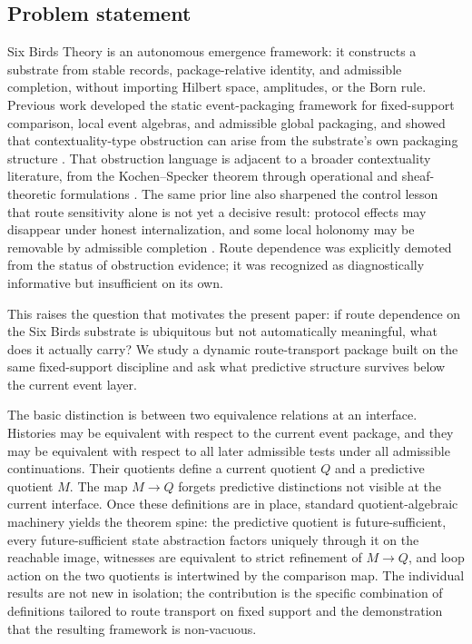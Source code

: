 \documentclass[11pt]{article}
\newcommand{\CurrentQ}{Q}
\newcommand{\PredictiveQ}{M}
\theoremstyle{definition}
\begin{document}
\subsection{Problem statement}\label{subsec:intro-problem}
Six Birds Theory is an autonomous emergence framework: it constructs a substrate from stable records, package-relative identity, and admissible completion, without importing Hilbert space, amplitudes, or the Born rule. Previous work developed the static event-packaging framework for fixed-support comparison, local event algebras, and admissible global packaging, and showed that contextuality-type obstruction can arise from the substrate's own packaging structure \citep{Tsiokos2026EventPackages}. That obstruction language is adjacent to a broader contextuality literature, from the Kochen--Specker theorem through operational and sheaf-theoretic formulations \citep{KochenSpecker1968ProblemHiddenVariables,Spekkens2005Contextuality,AbramskyBrandenburger2011SheafTheoretic}. The same prior line also sharpened the control lesson that route sensitivity alone is not yet a decisive result: protocol effects may disappear under honest internalization, and some local holonomy may be removable by admissible completion \citep{Tsiokos2026ProtocolTrap,Tsiokos2026FlattenStone}. Route dependence was explicitly demoted from the status of obstruction evidence; it was recognized as diagnostically informative but insufficient on its own.

This raises the question that motivates the present paper: if route dependence on the Six Birds substrate is ubiquitous but not automatically meaningful, what does it actually carry? We study a dynamic route-transport package built on the same fixed-support discipline and ask what predictive structure survives below the current event layer.

The basic distinction is between two equivalence relations at an interface. Histories may be equivalent with respect to the current event package, and they may be equivalent with respect to all later admissible tests under all admissible continuations. Their quotients define a current quotient $\CurrentQ$ and a predictive quotient $\PredictiveQ$. The map $\PredictiveQ \to \CurrentQ$ forgets predictive distinctions not visible at the current interface. Once these definitions are in place, standard quotient-algebraic machinery yields the theorem spine: the predictive quotient is future-sufficient, every future-sufficient state abstraction factors uniquely through it on the reachable image, witnesses are equivalent to strict refinement of $\PredictiveQ \to \CurrentQ$, and loop action on the two quotients is intertwined by the comparison map. The individual results are not new in isolation; the contribution is the specific combination of definitions tailored to route transport on fixed support and the demonstration that the resulting framework is non-vacuous.
\end{document}
